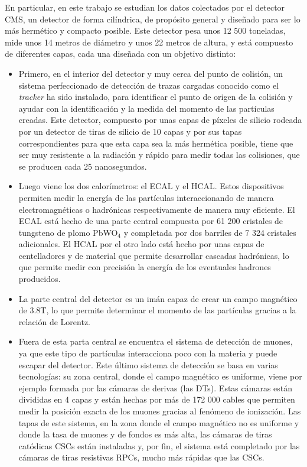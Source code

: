 \documentclass[a4paper, 10pt, openright]{report}
\begin{document}
\begin{appendices}
En particular, en este trabajo se estudian los datos colectados por el detector \ac{CMS}, un detector de forma cil\'{i}ndrica, de prop\'{o}sito general y dise\~{n}ado para ser lo m\'{a}s herm\'{e}tico y compacto posible. Este detector pesa unos 12 500 toneladas, mide unos 14 metros de di\'{a}metro y unos 22 metros de altura, y est\'{a} compuesto de diferentes capas, cada una dise\~{n}ada con un objetivo distinto:
\begin{itemize}
\item Primero, en el interior del detector y muy cerca del punto de colisi\'{o}n, un sistema perfeccionado de detecci\'{o}n de trazas cargadas conocido como el \textit{tracker} ha sido instalado, para identificar el punto de origen de la colisi\'{o}n y ayudar con la identificaci\'{o}n y la medida del momento de las part\'{i}culas creadas. Este detector, compuesto por unas capas de p\'{i}xeles de silicio rodeada por un detector de tiras de silicio de 10 capas y por sus tapas correspondientes para que esta capa sea la m\'{a}s herm\'{e}tica posible, tiene que ser muy resistente a la radiaci\'{o}n y r\'{a}pido para medir todas las colisiones, que se producen cada 25 nanosegundos.
\item Luego viene los dos calor\'{i}metros: el \ac{ECAL} y el \ac{HCAL}. Estos dispositivos permiten medir la energ\'{i}a de las part\'{i}culas interaccionando de manera electromagn\'{e}ticas o hadr\'{o}nicas respectivamente de manera muy eficiente. El \ac{ECAL} est\'{a} hecho de una parte central compuesta por 61 200 cristales de tungsteno de plomo PbWO$_4$ y completada por dos barriles de 7 324 cristales adicionales. El \ac{HCAL} por el otro lado est\'{a} hecho por unas capas de centelladores y de material que permite desarrollar cascadas hadr\'{o}nicas, lo que permite medir con precisi\'{o}n la energ\'{i}a de los eventuales hadrones producidos.
\item La parte central del detector es un im\'{a}n capaz de crear un campo magn\'{e}tico de 3.8T, lo que permite determinar el momento de las part\'{i}culas gracias a la relaci\'{o}n de Lorentz. 
\item Fuera de esta parta central se encuentra el sistema de detecci\'{o}n de muones, ya que este tipo de part\'{i}culas interacciona poco con la materia y puede escapar del detector. Este \'{u}ltimo sistema de detecci\'{o}n se basa en varias tecnolog\'{i}as: su zona central, donde el campo magn\'{e}tico es uniforme, viene por ejemplo formada por las c\'{a}maras de derivas (las \acp{DT}). Estas c\'{a}maras est\'{a}n divididas en 4 capas y est\'{a}n hechas por m\'{a}s de 172 000 cables que permiten medir la posici\'{o}n exacta de los muones gracias al fen\'{o}meno de ionizaci\'{o}n. Las tapas de este sistema, en la zona donde el campo magn\'{e}tico no es uniforme y donde la tasa de muones y de fondos es m\'{a}s alta, las c\'{a}maras de tiras cat\'{o}dicas \acp{CSC} est\'{a}n instaladas y, por fin, el sistema est\'{a} completado por las c\'{a}maras de tiras resistivas \acp{RPC}, mucho m\'{a}s r\'{a}pidas que las \acp{CSC}.
\end{itemize}


\end{appendices}
\end{document}
